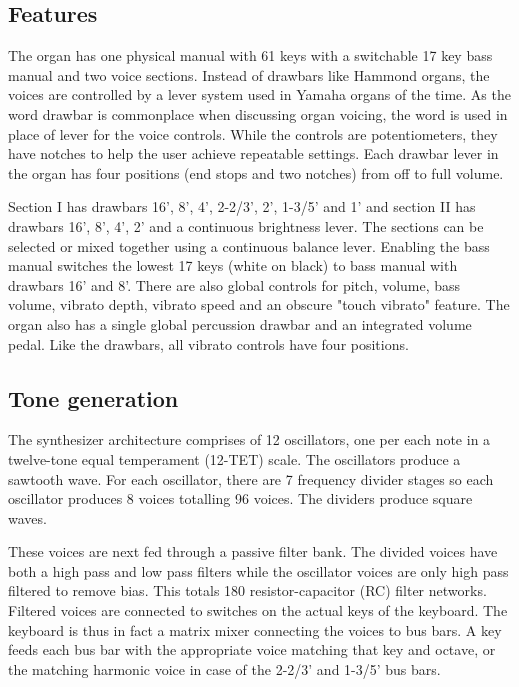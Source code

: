 \documentclass[11pt,a4paper]{article}
\begin{document}
\subsection{Features}

The organ has one physical manual with 61 keys with a switchable 17 key bass manual and two voice sections. Instead of drawbars like Hammond organs, the voices are controlled by a lever system used in Yamaha organs of the time. As the word drawbar is commonplace when discussing organ voicing, the word is used in place of lever for the voice controls. While the controls are potentiometers, they have notches to help the user achieve repeatable settings. Each drawbar lever in the organ has four positions (end stops and two notches) from off to full volume. 

Section I has drawbars 16', 8', 4', 2-2/3', 2', 1-3/5' and 1' and section II has drawbars 16', 8', 4', 2' and a continuous brightness lever. The sections can be selected or mixed together using a continuous balance lever. Enabling the bass manual switches the lowest 17 keys (white on black) to bass manual with drawbars 16' and 8'. There are also global controls for pitch, volume, bass volume, vibrato depth, vibrato speed and an obscure "touch vibrato" feature. The organ also has a single global percussion drawbar and an integrated volume pedal. Like the drawbars, all vibrato controls have four positions.

\subsection{Tone generation}

The synthesizer architecture comprises of 12 oscillators, one per each note in a twelve-tone equal temperament (12-TET) scale. The oscillators produce a sawtooth wave. For each oscillator, there are 7 frequency divider stages so each oscillator produces 8 voices totalling 96 voices. The dividers produce square waves. 

These voices are next fed through a passive filter bank. The divided voices have both a high pass and low pass filters while the oscillator voices are only high pass filtered to remove bias. This totals 180 resistor-capacitor (RC) filter networks. Filtered voices are connected to switches on the actual keys of the keyboard. The keyboard is thus in fact a matrix mixer connecting the voices to bus bars. A key feeds each bus bar with the appropriate voice matching that key and octave, or the matching harmonic voice in case of the 2-2/3' and 1-3/5' bus bars. 
\end{document}
